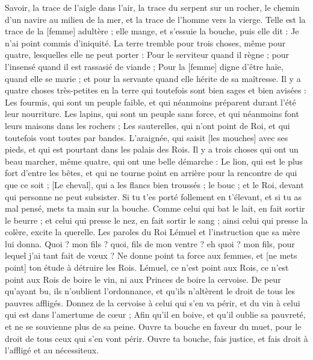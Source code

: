 \begin{multicols}{2}
Savoir, la trace de l'aigle dans l'air, la trace du serpent sur un rocher, le chemin d'un navire au milieu de la mer, et la trace de l'homme vers la vierge.
Telle est la trace de la [femme] adultère ; elle mange, et s'essuie la bouche, puis elle dit : Je n'ai point commis d'iniquité.
La terre tremble pour trois choses, même pour quatre, lesquelles elle ne peut porter :
Pour le serviteur quand il règne ; pour l'insensé quand il est rassasié de viande ;
Pour la [femme] digne d'être haïe, quand elle se marie ; et pour la servante quand elle hérite de sa maîtresse.
Il y a quatre choses très-petites en la terre qui toutefois sont bien sages et bien avisées :
Les fourmis, qui sont un peuple faible, et qui néanmoins préparent durant l'été leur nourriture.
Les lapins, qui sont un peuple sans force, et qui néanmoins font leurs maisons dans les rochers ;
Les sauterelles, qui n'ont point de Roi, et qui toutefois vont toutes par bandes.
L'araignée, qui saisit [les mouches] avec ses pieds, et qui est pourtant dans les palais des Rois.
Il y a trois choses qui ont un beau marcher, même quatre, qui ont une belle démarche :
Le lion, qui est le plus fort d'entre les bêtes, et qui ne tourne point en arrière pour la rencontre de qui que ce soit ;
[Le cheval], qui a les flancs bien troussés ; le bouc ; et le Roi, devant qui personne ne peut subsister.
Si tu t'es porté follement en t'élevant, et si tu as mal pensé, mets ta main sur la bouche.
Comme celui qui bat le lait, en fait sortir le beurre ; et celui qui presse le nez, en fait sortir le sang ; ainsi celui qui presse la colère, excite la querelle.
\VerseOne{}Les paroles du Roi Lémuel et l'instruction que sa mère lui donna.
Quoi ? mon fils ? quoi, fils de mon ventre ? eh quoi ? mon fils, pour lequel j'ai tant fait de vœux ?
Ne donne point ta force aux femmes, et [ne mets point] ton étude à détruire les Rois.
Lémuel, ce n'est point aux Rois, ce n'est point aux Rois de boire le vin, ni aux Princes de boire la cervoise.
De peur qu'ayant bu, ils n'oublient l'ordonnance, et qu'ils n'altèrent le droit de tous les pauvres affligés.
Donnez de la cervoise à celui qui s'en va périr, et du vin à celui qui est dans l'amertume de cœur ;
Afin qu'il en boive, et qu'il oublie sa pauvreté, et ne se souvienne plus de sa peine.
Ouvre ta bouche en faveur du muet, pour le droit de tous ceux qui s'en vont périr.
Ouvre ta bouche, fais justice, et fais droit à l'affligé et au nécessiteux.

\end{multicols}
